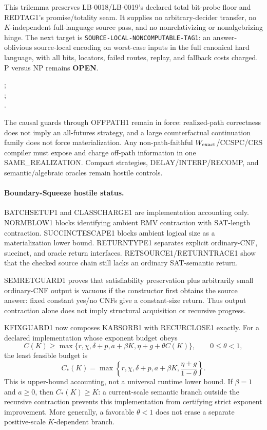 \documentclass[11pt]{article}
\begin{document}
This trilemma preserves LB-0018/LB-0019's declared total bit-probe floor and
REDTAG1's promise/totality seam.  It supplies no arbitrary-decider transfer,
no \(K\)-independent full-language source pass, and no nonrelativizing or
nonalgebrizing hinge.  The next target is
\texttt{SOURCE-LOCAL-NONCOMPUTABLE-TAG1}: an answer-oblivious source-local
encoding on worst-case inputs in the full canonical hard language, with all
bits, locators, failed routes, replay, and fallback costs charged.  P versus
NP remains \textbf{OPEN}.

;\\
;\\
.


The causal guards through OFFPATH1 remain in force: realized-path correctness does not imply an all-futures strategy, and a large counterfactual continuation family does not force materialization. Any non-path-faithful \(W_{\rm exact}\)/CCSPC/CRS compiler must expose and charge off-path information in one SAME\_REALIZATION. Compact strategies, DELAY/INTERP/RECOMP, and semantic/algebraic oracles remain hostile controls.

\paragraph{Boundary-Squeeze hostile status.}
BATCHSETUP1 and CLASSCHARGE1 are implementation accounting only. NORMBLOW1 blocks identifying ambient RMV contraction with SAT-length contraction. SUCCINCTESCAPE1 blocks ambient logical size as a materialization lower bound. RETURNTYPE1 separates explicit ordinary-CNF, succinct, and oracle return interfaces. RETSOURCE1/RETURNTRACE1 show that the checked source chain still lacks an ordinary SAT-semantic return.

SEMRETGUARD1 proves that satisfiability preservation plus arbitrarily small ordinary-CNF output is vacuous if the constructor first obtains the source answer: fixed constant yes/no CNFs give a constant-size return. Thus output contraction alone does not imply structural acquisition or recursive progress.

KFIXGUARD1 now composes KABSORB1 with RECURCLOSE1 exactly. For a declared implementation whose exponent budget obeys
\[
C(K)\ge\max\{r,\chi,\delta+p,a+\beta K,\eta+g+\theta C(K)\},
\qquad 0\le\theta<1,
\]
the least feasible budget is
\[
\boxed{
C_*(K)=
\max\left\{
r,\chi,\delta+p,a+\beta K,
\frac{\eta+g}{1-\theta}
\right\}.
}
\]
This is upper-bound accounting, not a universal runtime lower bound. If \(\beta=1\) and \(a\ge0\), then \(C_*(K)\ge K\): a current-scale semantic branch outside the recursive contraction prevents this implementation from certifying strict exponent improvement. More generally, a favorable \(\theta<1\) does not erase a separate positive-scale \(K\)-dependent branch.
\end{document}
